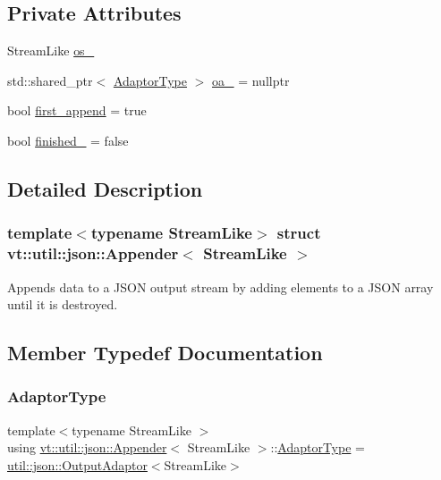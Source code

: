 \subsection*{Private Attributes}
\begin{DoxyCompactItemize}
\item 
Stream\+Like \hyperlink{structvt_1_1util_1_1json_1_1_appender_ab0078667ec1395e92014adc1aaa782e5}{os\+\_\+}
\item 
std\+::shared\+\_\+ptr$<$ \hyperlink{structvt_1_1util_1_1json_1_1_appender_ae7a25e7544d8529cb466651fff13db0b}{Adaptor\+Type} $>$ \hyperlink{structvt_1_1util_1_1json_1_1_appender_a43e091b8545dc6a7664bddc38ffd4e77}{oa\+\_\+} = nullptr
\item 
bool \hyperlink{structvt_1_1util_1_1json_1_1_appender_a1c035d54bb69b9bab1136eab1dd69263}{first\+\_\+append} = true
\item 
bool \hyperlink{structvt_1_1util_1_1json_1_1_appender_aa34d4af41777c8f610e9c93b03a034de}{finished\+\_\+} = false
\end{DoxyCompactItemize}


\subsection{Detailed Description}
\subsubsection*{template$<$typename Stream\+Like$>$\newline
struct vt\+::util\+::json\+::\+Appender$<$ Stream\+Like $>$}

Appends data to a J\+S\+ON output stream by adding elements to a J\+S\+ON array until it is destroyed. 

\subsection{Member Typedef Documentation}
\mbox{\label{structvt_1_1util_1_1json_1_1_appender_ae7a25e7544d8529cb466651fff13db0b}} 
\subsubsection{\texorpdfstring{Adaptor\+Type}{AdaptorType}}
{\footnotesize\ttfamily template$<$typename Stream\+Like $>$ \\
using \hyperlink{structvt_1_1util_1_1json_1_1_appender}{vt\+::util\+::json\+::\+Appender}$<$ Stream\+Like $>$\+::\hyperlink{structvt_1_1util_1_1json_1_1_appender_ae7a25e7544d8529cb466651fff13db0b}{Adaptor\+Type} =  \hyperlink{structvt_1_1util_1_1json_1_1_output_adaptor}{util\+::json\+::\+Output\+Adaptor}$<$Stream\+Like$>$}

